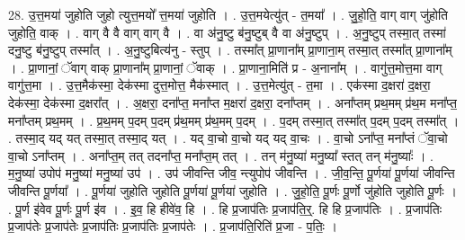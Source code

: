 \documentclass[17pt]{extarticle}
\begin{document}
28. उ॒त्त॒मया॑ जुहोति जुहो त्युत्त॒मयो᳚ त्त॒मया॑ जुहोति । . उ॒त्त॒मयेत्यु॑त् - त॒मया᳚ । . जु॒हो॒ति॒ वाग् वाग् जु॑होति जुहोति॒ वाक् । . वाग् वै वै वाग् वाग् वै । . वा अ॑नु॒ष्टु ब॑नु॒ष्टुब् वै वा अ॑नु॒ष्टुप् । . अ॒नु॒ष्टुप् तस्मा॒त् तस्मा॑ दनु॒ष्टु ब॑नु॒ष्टुप् तस्मा᳚त् । . अ॒नु॒ष्टुबित्य॑नु - स्तुप् । . तस्मा᳚त् प्रा॒णाना᳚म् प्रा॒णाना॒म् तस्मा॒त् तस्मा᳚त् प्रा॒णाना᳚म् । . प्रा॒णानां॒ ॅवाग् वाक् प्रा॒णाना᳚म् प्रा॒णानां॒ ॅवाक् । . प्रा॒णाना॒मिति॑ प्र - अ॒नाना᳚म् । . वागु॑त्त॒मोत्त॒मा वाग् वागु॑त्त॒मा । . उ॒त्त॒मैक॑स्मा॒ देक॑स्मा दुत्त॒मोत्त॒ मैक॑स्मात् । . उ॒त्त॒मेत्यु॑त् - त॒मा । . एक॑स्मा द॒क्षरा॑ द॒क्षरा॒ देक॑स्मा॒ देक॑स्मा द॒क्षरा᳚त् । . अ॒क्षरा॒ दना᳚प्त॒ मना᳚प्त म॒क्षरा॑ द॒क्षरा॒ दना᳚प्तम् । . अना᳚प्तम् प्रथ॒मम् प्र॑थ॒म मना᳚प्त॒ मना᳚प्तम् प्रथ॒मम् । . प्र॒थ॒मम् प॒दम् प॒दम् प्र॑थ॒मम् प्र॑थ॒मम् प॒दम् । . प॒दम् तस्मा॒त् तस्मा᳚त् प॒दम् प॒दम् तस्मा᳚त् । . तस्मा॒द् यद् यत् तस्मा॒त् तस्मा॒द् यत् । . यद् वा॒चो वा॒चो यद् यद् वा॒चः । . वा॒चो ऽना᳚प्त॒ मना᳚प्तं ॅवा॒चो वा॒चो ऽना᳚प्तम् । . अना᳚प्त॒म् तत् तदना᳚प्त॒ मना᳚प्त॒म् तत् । . तन् म॑नु॒ष्या॑ मनु॒ष्या᳚ स्तत् तन् म॑नु॒ष्याः᳚ । . म॒नु॒ष्या॑ उपोप॑ मनु॒ष्या॑ मनु॒ष्या॑ उप॑ । . उप॑ जीवन्ति जीव॒ न्त्युपोप॑ जीवन्ति । . जी॒व॒न्ति॒ पू॒र्णया॑ पू॒र्णया॑ जीवन्ति जीवन्ति पू॒र्णया᳚ । . पू॒र्णया॑ जुहोति जुहोति पू॒र्णया॑ पू॒र्णया॑ जुहोति । . जु॒हो॒ति॒ पू॒र्णः पू॒र्णो जु॑होति जुहोति पू॒र्णः । . पू॒र्ण इ॑वेव पू॒र्णः पू॒र्ण इ॑व । . इ॒व॒ हि हीवे॑व॒ हि । . हि प्र॒जाप॑तिः प्र॒जाप॑ति॒र्॒. हि हि प्र॒जाप॑तिः । . प्र॒जाप॑तिः प्र॒जाप॑तेः प्र॒जाप॑तेः प्र॒जाप॑तिः प्र॒जाप॑तिः प्र॒जाप॑तेः । . प्र॒जाप॑ति॒रिति॑ प्र॒जा - प॒तिः॒ । \newline
\end{document}
